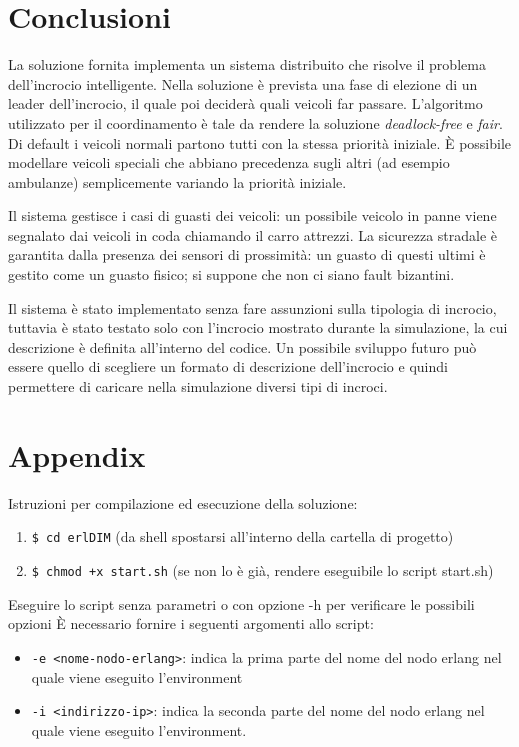 \documentclass{memoir}
\begin{document}


\chapter{Conclusioni}
La soluzione fornita implementa un sistema distribuito che risolve il problema
dell'incrocio intelligente. Nella soluzione è prevista una fase di elezione di
un leader dell'incrocio, il quale poi deciderà quali veicoli far passare.
L'algoritmo utilizzato per il coordinamento è tale da rendere la soluzione
\emph{deadlock-free} e \emph{fair}. Di default i veicoli normali partono tutti
con la stessa priorità iniziale. È possibile modellare veicoli speciali che
abbiano precedenza sugli altri (ad esempio ambulanze) semplicemente variando la
priorità iniziale.

Il sistema gestisce i casi di guasti dei veicoli: un possibile veicolo in panne
viene segnalato dai veicoli in coda chiamando il carro attrezzi. La sicurezza
stradale è garantita dalla presenza dei sensori di prossimità: un guasto di
questi ultimi è gestito come un guasto fisico; si suppone che non ci siano fault
bizantini.

Il sistema è stato implementato senza fare assunzioni sulla tipologia di
incrocio, tuttavia è stato testato solo con l'incrocio mostrato durante la
simulazione, la cui descrizione è definita all'interno del codice. Un possibile
sviluppo futuro può essere quello di scegliere un formato di descrizione
dell'incrocio e quindi permettere di caricare nella simulazione diversi tipi di
incroci.


\appendix

\chapter{Appendix}

Istruzioni per compilazione ed esecuzione della soluzione:
\begin{enumerate}
\item \texttt{\$ cd erlDIM} (da shell spostarsi all'interno della cartella di
  progetto)
\item \texttt{\$ chmod +x start.sh} (se non lo è già, rendere eseguibile lo
  script start.sh)
\end{enumerate}
Eseguire lo script senza parametri o con opzione -h per verificare le possibili
opzioni È necessario fornire i seguenti argomenti allo script:
\begin{itemize}
\item \texttt{-e <nome-nodo-erlang>}: indica la prima parte del nome del nodo
  erlang nel quale viene eseguito l'environment
\item \texttt{-i <indirizzo-ip>}: indica la seconda parte del nome del nodo
  erlang nel quale viene eseguito l'environment.
\end{itemize}
\end{document}
